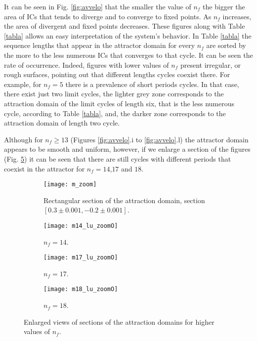 It can be seen in Fig. \ref{fig:avvelo} that the smaller the value of $n_f$ the bigger the area of ICs that tends to diverge and to converge to fixed points.
As $n_f$ increases, the area of divergent and fixed points decreases.
These figures along with Table \ref{tabla} allows an easy interpretation of the system's behavior.
In Table \ref{tabla} the sequence lengths that appear in the attractor domain for every $n_f$ are sorted by the more to the less numerous ICs that converges to that cycle.
It can be seen the rate of occurrence.
Indeed, figures with lower values of $n_f$ present irregular, or rough surfaces, pointing out that different lengths cycles coexist there.
For example, for $n_f=5$ there is a prevalence of  short periods cycles.
In that case, there exist just two limit cycles, the lighter grey zone corresponds to the attraction domain of the limit cycles of length six, that is the less numerous cycle, according to Table \ref{tabla}, and, the darker zone corresponds to the attraction domain of length two cycle.

Although for $n_f \geqslant 13$ (Figures \ref{fig:avvelo}.i to \ref{fig:avvelo}.l) the attractor domain appears to be smooth and uniform, however, if we enlarge a section of the figures (Fig. \ref{fig:m_zoom}) it can be seen that there are still cycles with different periods that coexist in the attractor for $n_f=14$,$17$ and $18$.
%
\begin{figure}
    \centering
    \begin{subfigure}[t]{0.49\textwidth}
        \texttt{[image: m\_zoom]}
        \caption{Rectangular section of the attraction domain, section $[0.3\pm 0.001, -0.2\pm 0.001]$.}
        \label{fig:gull}
    \end{subfigure}
    \hfill 
    \begin{subfigure}[t]{0.49\textwidth}
        \texttt{[image: m14\_lu\_zoomO]}
        \caption{$n_f=14$.}
        \label{fig:tiger}
    \end{subfigure}
   \hfill  
    \begin{subfigure}[t]{0.49\textwidth}
        \texttt{[image: m17\_lu\_zoomO]}
        \caption{$n_f=17$.}
        \label{fig:mouse}
    \end{subfigure}
  \hfill   
    \begin{subfigure}[t]{0.49\textwidth}
        \texttt{[image: m18\_lu\_zoomO]}
        \caption{$n_f=18$.}
        \label{fig:mouse}
    \end{subfigure}
    \caption{Enlarged views of sections of the attraction domains for higher values of $n_f$.}\label{fig:m_zoom}
\end{figure}


